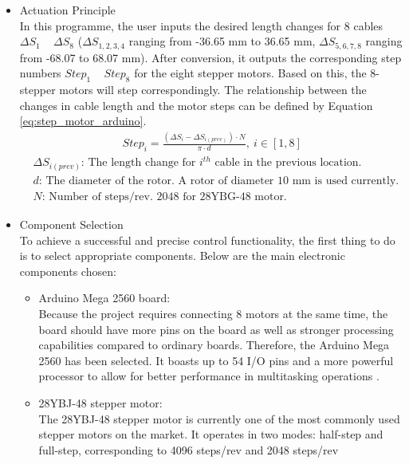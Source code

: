 \begin{itemize}
    \item Actuation Principle\\
    In this programme, the user inputs the desired length changes for 8 cables $\Delta S_1$ ~ $\Delta S_8$ 
    ($\Delta S_{1,2,3,4}$ ranging from -36.65 mm to 36.65 mm, $\Delta S_{5,6,7,8}$ ranging from -68.07 to 68.07 mm). 
    After conversion, it outputs the corresponding step numbers $Step_1$ ~ $Step_8$ for the eight stepper motors. 
    Based on this, the 8-stepper motors will step correspondingly. The relationship between the changes in 
    cable length and the motor steps can be defined by Equation \ref{eq:step_motor_arduino}. \\
    \begin{align}
        & \qquad\qquad\qquad\qquad Step_i=\frac{(\Delta S_i-\Delta S_{i(prev)})\cdot N}{\pi\cdot d}, \ i\in[1,8] 
        \label{eq:step_motor_arduino} \\
        &\Delta S_{i(prev)} \text{: The length change for $i^{th}$ cable in the previous location.} \nonumber \\
        &d\text{: The diameter of the rotor. A rotor of diameter 10 mm is used currently.} \nonumber \\
        &N\text{: Number of steps/rev. 2048 for 28YBG-48 motor.}\nonumber 
    \end{align}
    \item Component Selection \\
    To achieve a successful and precise control functionality, the first thing to do is to select appropriate 
    components. Below are the main electronic components chosen:
    \begin{itemize}
        \item Arduino Mega 2560 board: \\
        Because the project requires connecting 8 motors at the same time, the board should have more pins on the 
        board as well as stronger processing capabilities compared to ordinary boards. Therefore, the Arduino Mega 
        2560 has been selected. It boasts up to 54 I/O pins and a more powerful processor to allow for better 
        performance in multitasking operations \cite{arduino_guide}.
        \item 28YBJ-48 stepper motor: \\
        The 28YBJ-48 stepper motor is currently one of the most commonly used stepper motors on the market. It 
        operates in two modes: half-step and full-step, corresponding to 4096 steps/rev and 2048 steps/rev 

\end{itemize}
\end{itemize}
